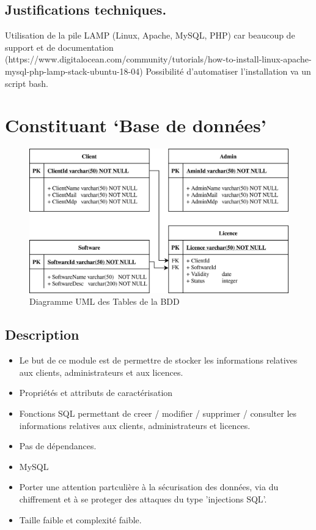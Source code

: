 \subsection{Justifications techniques.}
Utilisation de la pile LAMP (Linux, Apache, MySQL, PHP) car beaucoup de 
support et de documentation (https://www.digitalocean.com/community/tutorials/how-to-install-linux-apache-mysql-php-lamp-stack-ubuntu-18-04)\newline
Possibilité d'automatiser l'installation va un script bash.

\section{Constituant `Base de données'}

\begin{figure}[h!]
	\centering
	\includegraphics[width=\textwidth]{../png/SQL_table.png}
	\caption{Diagramme UML des Tables de la BDD}
	\label{fig:fig2}
\end{figure}

\subsection{Description}
\begin{itemize}
	\item Le but de ce module est de permettre de stocker les informations relatives aux
				clients, administrateurs et aux licences. 
	\item Propriétés et attributs de caractérisation
	\item Fonctions SQL permettant de creer / modifier / supprimer / consulter les 
				informations relatives aux clients, administrateurs et licences.
	\item Pas de dépendances.	
	\item MySQL 
	\item Porter une attention partculière à la sécurisation des données, via
				du chiffrement et à se proteger des attaques du type 'injections SQL'. 
	\item Taille faible et complexité faible. 
\end{itemize}
